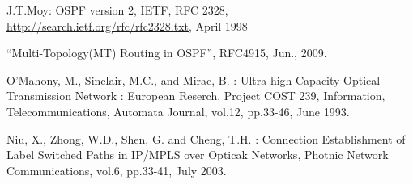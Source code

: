 \documentclass[11pt, dvipdfmx]{jreport}
\begin{document}
\begin{thebibliography}{99}
	J.T.Moy: OSPF version 2, IETF, 
	RFC 2328, \url{http://search.ietf.org/rfc/rfc2328.txt}, April 1998
	
	“Multi-Topology(MT) Routing in OSPF”, RFC4915, Jun., 2009.
	
	O’Mahony, M., Sinclair, M.C., and Mirac, B. : Ultra high Capacity Optical Transmission Network : European
	Reserch, Project COST 239, Information, Telecommunications, Automata Journal, vol.12, pp.33-46, June
	1993.

	Niu, X., Zhong, W.D., Shen, G. and Cheng, T.H. : Connection Establishment of Label Switched Paths in
	IP/MPLS over Opticak Networks, Photnic Network Communications, vol.6, pp.33-41, July 2003.
	
	
\end{thebibliography}
\end{document}
